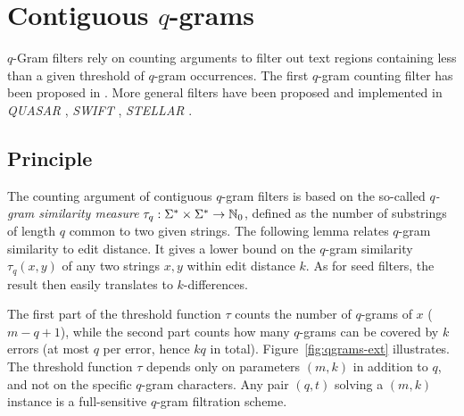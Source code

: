 




\section{Contiguous $q$-grams}
\label{sec:filtering:qgrams-ext}

$q$-Gram filters rely on counting arguments to filter out text regions containing less than a given threshold of $q$-gram occurrences.
The first $q$-gram counting filter has been proposed in \citep{Jokinen1991}.
More general filters have been proposed and implemented in \emph{QUASAR} \citep{Burkhardt1999}, \emph{SWIFT} \citep{Rasmussen2006}, \emph{STELLAR} \citep{Kehr2011}.

\subsection{Principle}

The counting argument of contiguous $q$-gram filters is based on the so-called \emph{$q$-gram similarity measure} $\tau_q : \Sigma^{*} \times \Sigma^{*} \rightarrow \mathbb {N}_0$, defined as the number of substrings of length $q$ common to two given strings.
The following lemma relates $q$-gram similarity to edit distance.
It gives a lower bound on the $q$-gram similarity $\tau_q(x,y)$ of any two strings $x,y$ within edit distance $k$.
As for seed filters, the result then easily translates to $k$-differences.

The first part of the threshold function $\tau$ counts the number of $q$-grams of $x$ (\ie $m - q + 1$), while the second part counts how many $q$-grams can be covered by $k$ errors (\ie at most $q$ per error, hence $kq$ in total).
Figure~\ref{fig:qgrams-ext} illustrates.
The threshold function $\tau$ depends only on parameters $(m,k)$ in addition to $q$, and not on the specific $q$-gram characters.
Any pair $(q,t)$ solving a $(m,k)$ instance is a full-sensitive $q$-gram filtration scheme.

